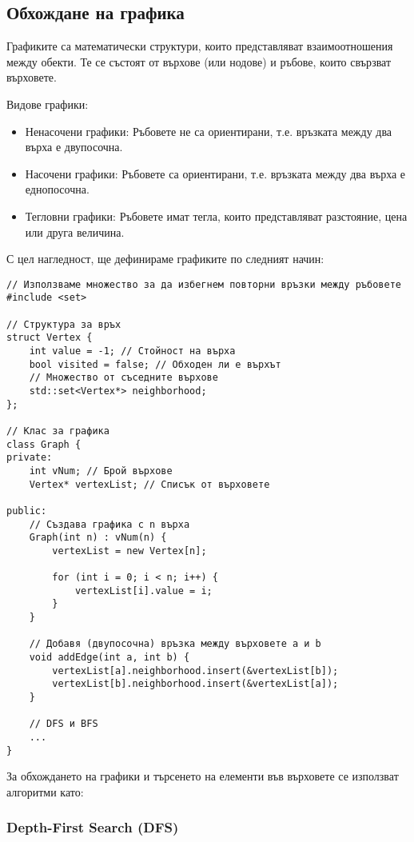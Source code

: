 \documentclass[oneside]{book}
\begin{document}
\subsection{Обхождане на графика}
Графиките са математически структури, които представляват взаимоотношения между обекти. Те се състоят от върхове (или нодове) и ръбове, които свързват върховете.

Видове графики:
\begin{itemize}
    \item[] Ненасочени графики: Ръбовете не са ориентирани, т.е. връзката между два върха е двупосочна.
    \item[] Насочени графики: Ръбовете са ориентирани, т.е. връзката между два върха е еднопосочна.
    \item[] Тегловни графики: Ръбовете имат тегла, които представляват разстояние, цена или друга величина.
\end{itemize}

С цел нагледност, ще дефинираме графиките по следният начин:
\begin{mdframed}\begin{lstlisting}
// Използваме множество за да избегнем повторни връзки между ръбовете
#include <set>

// Структура за връх
struct Vertex {
    int value = -1; // Стойност на върха
    bool visited = false; // Обходен ли е върхът
    // Множество от съседните върхове
    std::set<Vertex*> neighborhood; 
};

// Клас за графика
class Graph {
private:
    int vNum; // Брой върхове
    Vertex* vertexList; // Списък от върховете

public:
    // Създава графика с n върха
    Graph(int n) : vNum(n) {
        vertexList = new Vertex[n];

        for (int i = 0; i < n; i++) {
            vertexList[i].value = i;
        }
    }

    // Добавя (двупосочна) връзка между върховете a и b
    void addEdge(int a, int b) {
        vertexList[a].neighborhood.insert(&vertexList[b]);
        vertexList[b].neighborhood.insert(&vertexList[a]);
    }

    // DFS и BFS
    ...
}
\end{lstlisting}\end{mdframed}

За обхождането на графики и търсенето на елементи във върховете се използват алгоритми като:

\subsubsection{Depth-First Search (DFS)}
\end{document}
